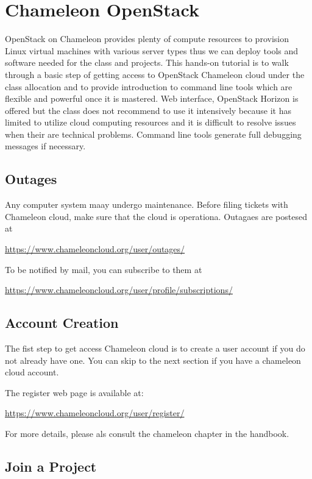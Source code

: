 \section{Chameleon OpenStack}
\label{chameleon-openstack}

OpenStack on Chameleon provides plenty of compute resources to
provision Linux virtual machines with various server types thus we can
deploy tools and software needed for the class and projects. This
hands-on tutorial is to walk through a basic step of getting access to
OpenStack Chameleon cloud under the class allocation and to provide
introduction to command line tools which are flexible and powerful
once it is mastered. Web interface, OpenStack Horizon is offered but
the class does not recommend to use it intensively because it has
limited to utilize cloud computing resources and it is difficult to
resolve issues when their are technical problems. Command line tools
generate full debugging messages if necessary.


\subsection{Outages}

Any computer system maay undergo maintenance. Before filing tickets
with Chameleon cloud, make sure that the cloud is operationa. Outagaes
are postesed at 

\url{https://www.chameleoncloud.org/user/outages/}

To be notified by mail, you can subscribe to them at 

\url{https://www.chameleoncloud.org/user/profile/subscriptions/}

\subsection{Account Creation}

The fist step to get access Chameleon cloud is to create a user
account if you do not already have one. You can skip to the next
section if you have a chameleon cloud account.

The register web page is available at:

\url{https://www.chameleoncloud.org/user/register/}

For more details, please als consult the chameleon chapter in the handbook.

\subsection{Join a Project}

